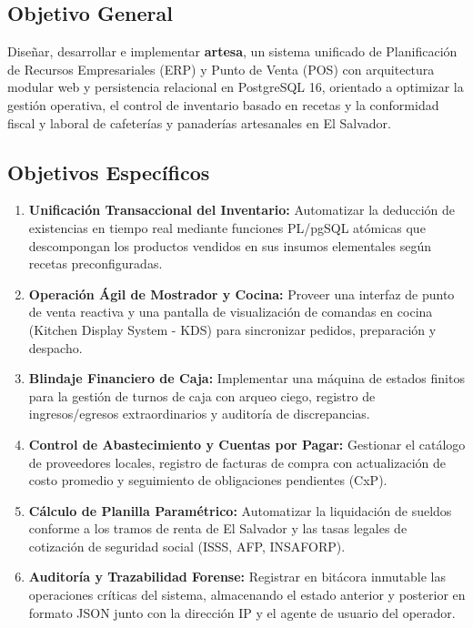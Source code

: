 \subsection{Objetivo General}
Diseñar, desarrollar e implementar \textbf{artesa}, un sistema unificado de Planificación de Recursos Empresariales (ERP) y Punto de Venta (POS) con arquitectura modular web y persistencia relacional en PostgreSQL 16, orientado a optimizar la gestión operativa, el control de inventario basado en recetas y la conformidad fiscal y laboral de cafeterías y panaderías artesanales en El Salvador.

\subsection{Objetivos Específicos}
\begin{enumerate}
    \item \textbf{Unificación Transaccional del Inventario:} Automatizar la deducción de existencias en tiempo real mediante funciones PL/pgSQL atómicas que descompongan los productos vendidos en sus insumos elementales según recetas preconfiguradas.
    \item \textbf{Operación Ágil de Mostrador y Cocina:} Proveer una interfaz de punto de venta reactiva y una pantalla de visualización de comandas en cocina (Kitchen Display System - KDS) para sincronizar pedidos, preparación y despacho.
    \item \textbf{Blindaje Financiero de Caja:} Implementar una máquina de estados finitos para la gestión de turnos de caja con arqueo ciego, registro de ingresos/egresos extraordinarios y auditoría de discrepancias.
    \item \textbf{Control de Abastecimiento y Cuentas por Pagar:} Gestionar el catálogo de proveedores locales, registro de facturas de compra con actualización de costo promedio y seguimiento de obligaciones pendientes (CxP).
    \item \textbf{Cálculo de Planilla Paramétrico:} Automatizar la liquidación de sueldos conforme a los tramos de renta de El Salvador y las tasas legales de cotización de seguridad social (ISSS, AFP, INSAFORP).
    \item \textbf{Auditoría y Trazabilidad Forense:} Registrar en bitácora inmutable las operaciones críticas del sistema, almacenando el estado anterior y posterior en formato JSON junto con la dirección IP y el agente de usuario del operador.
\end{enumerate}
